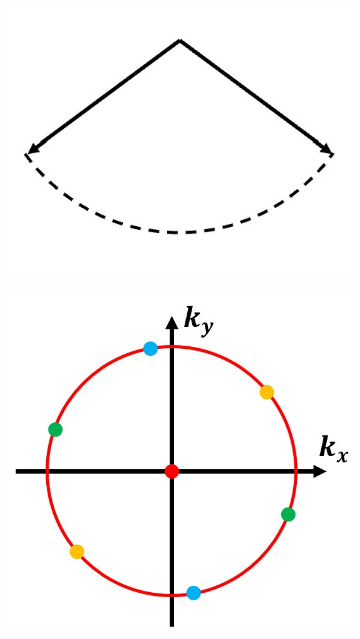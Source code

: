 \begin{figure}
	\centering
	\begin{subfigure}[t]{0.25\textwidth}
		\centering
		\includegraphics[width=\linewidth]{images/amplitude_wave_vectors_2D.jpg}
		\caption{}
		\label{fig:amplitude_wave_vectors_2D}
	\end{subfigure}
	\begin{subfigure}[t]{0.265\textwidth}
		\centering
		\includegraphics[width=\linewidth]{images/3D_SIM_OTF_stripe_angles.jpg}

\end{subfigure}
\end{figure}
